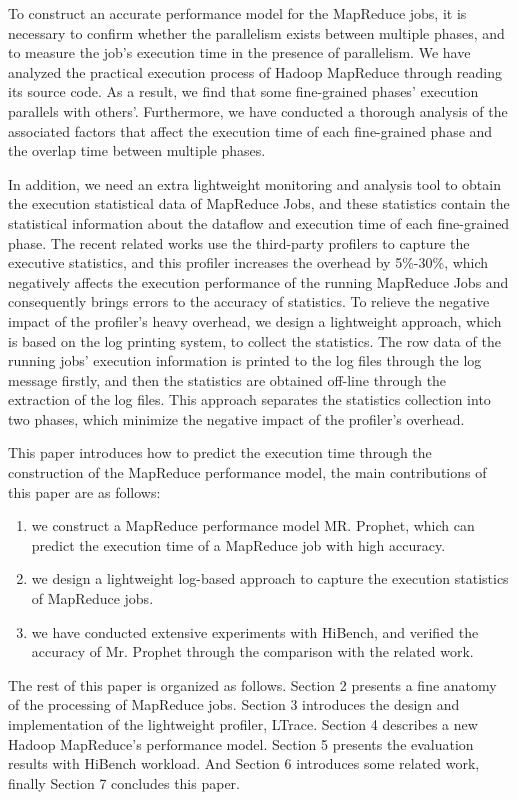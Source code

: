  To construct an accurate performance model for the MapReduce jobs, it is necessary to confirm whether the parallelism exists between multiple phases, and to measure the job's execution time in the presence of parallelism. We have analyzed the practical execution process of Hadoop MapReduce through reading its source code. As a result, we find that some fine-grained phases' execution parallels with others'. Furthermore, we have conducted a thorough analysis of the associated factors that affect the execution time of each fine-grained phase and the overlap time between multiple phases.

In addition, we need an extra lightweight monitoring and analysis tool to obtain the execution statistical data of MapReduce Jobs, and these statistics contain the statistical information about the dataflow and execution time of each fine-grained phase. The recent related works use the third-party profilers to capture the executive statistics, and this profiler increases the overhead by 5\%-30\%, which negatively affects the execution performance of the running MapReduce Jobs and consequently brings errors to the accuracy of statistics. To relieve the negative impact of the profiler's heavy overhead, we design a lightweight approach, which is based on the log printing system, to collect the statistics. The row data of the running jobs' execution information is printed to the log files through the log message firstly, and then the statistics are obtained off-line through the extraction of the log files. This approach separates the statistics collection into two phases, which minimize the negative impact of the profiler's overhead.

This paper introduces how to predict the execution time through the construction of the MapReduce performance model, the main contributions of this paper are as follows:
\begin{enumerate}
    \item  we construct a MapReduce performance model MR. Prophet, which can predict the execution time of a MapReduce job with high accuracy.
    \item  we design a lightweight log-based approach to capture the execution statistics of MapReduce jobs.
    \item  we have conducted extensive experiments with HiBench, and verified the accuracy of Mr. Prophet through the comparison with the related work.
\end{enumerate}

The rest of this paper is organized as follows. Section 2 presents a fine anatomy of the processing of MapReduce jobs. Section 3 introduces the design and implementation of the lightweight profiler, LTrace. Section 4 describes a new Hadoop MapReduce's performance model. Section 5 presents the evaluation results with HiBench workload. And Section 6 introduces some related work, finally Section 7 concludes this paper.
